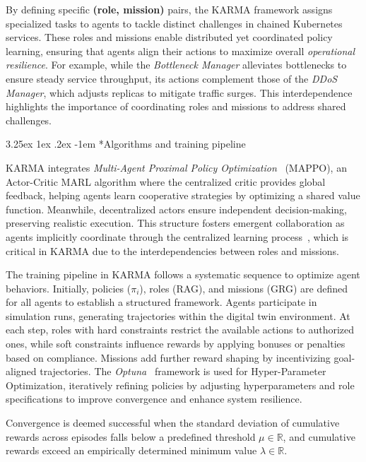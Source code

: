 \documentclass[conference]{IEEEtran}
\makeatletter
\renewcommand\paragraph{\@startsection{paragraph}{5}{\z@}%
  {3.25ex \@plus1ex \@minus.2ex}%
  {-1em}%
  {\normalfont\normalsize\bfseries}}
\makeatother
\begin{document}
By defining specific \textbf{(role, mission)} pairs, the KARMA framework assigns specialized tasks to agents to tackle distinct challenges in chained Kubernetes services. These roles and missions enable distributed yet coordinated policy learning, ensuring that agents align their actions to maximize overall \textit{operational resilience}. For example, while the \textit{Bottleneck Manager} alleviates bottlenecks to ensure steady service throughput, its actions complement those of the \textit{DDoS Manager}, which adjusts replicas to mitigate traffic surges. This interdependence highlights the importance of coordinating roles and missions to address shared challenges.

\paragraph*{Algorithms and training pipeline}

KARMA integrates \textit{Multi-Agent Proximal Policy Optimization}~\cite{Yu2022} (MAPPO), an Actor-Critic MARL algorithm where the centralized critic provides global feedback, helping agents learn cooperative strategies by optimizing a shared value function. Meanwhile, decentralized actors ensure independent decision-making, preserving realistic execution. This structure fosters emergent collaboration as agents implicitly coordinate through the centralized learning process~\cite{Yu2022}, which is critical in KARMA due to the interdependencies between roles and missions.

The training pipeline in KARMA follows a systematic sequence to optimize agent behaviors. Initially, policies (\(\pi_i\)), roles (RAG), and missions (GRG) are defined for all agents to establish a structured framework. Agents participate in simulation runs, generating trajectories within the digital twin environment. At each step, roles with hard constraints restrict the available actions to authorized ones, while soft constraints influence rewards by applying bonuses or penalties based on compliance. Missions add further reward shaping by incentivizing goal-aligned trajectories. The \textit{Optuna}~\cite{akiba2019optuna} framework is used for Hyper-Parameter Optimization, iteratively refining policies by adjusting hyperparameters and role specifications to improve convergence and enhance system resilience.

Convergence is deemed successful when the standard deviation of cumulative rewards across episodes falls below a predefined threshold $\mu \in \mathbb{R}$, and cumulative rewards exceed an empirically determined minimum value $\lambda \in \mathbb{R}$.
\end{document}
